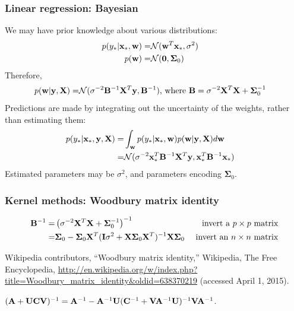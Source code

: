 \begin{frame}
\frametitle{Linear regression: Bayesian}
We may have prior knowledge about various distributions:
\begin{align*}
p(y_* | {\bf x}_*, {\bf w}) = & \mathcal{N}({\bf w}^T{\bf x}_*, \sigma^2)\cr
p({\bf w}) = & \mathcal{N}({\bf 0},\boldsymbol\Sigma_0)\cr
\end{align*}
Therefore,
\begin{align*}
p({\bf w}|{\bf y},{\bf X})  = & \mathcal{N}(\sigma^{-2}{\bf B}^{-1}{\bf X}^T{\bf y},{\bf B}^{-1}) \text{, where } {\bf B} = \sigma^{-2}{\bf X}^T{\bf X} + \boldsymbol\Sigma_0^{-1}
\end{align*}
Predictions are made by integrating out the uncertainty of the weights, rather than estimating them:
\begin{align*}
p(y_* | {\bf x}_*, {\bf y}, {\bf X}) = & \int_{\bf w} p(y_* | {\bf x}_*, {\bf w}) p({\bf w}|{\bf y},{\bf X}) d{\bf w}\cr
                                     = & \mathcal{N}(\sigma^{-2} {\bf x}_*^T {\bf B}^{-1} {\bf X}^T {\bf y}, {\bf x}_*^T{\bf B}^{-1}{\bf x}_*)
\end{align*}
Estimated parameters may be $\sigma^2$, and parameters encoding $\boldsymbol\Sigma_0$.
\end{frame}

\begin{frame}
\frametitle{Kernel methods: Woodbury matrix identity}
\begin{align*}
{\bf B}^{-1} = & \left(\sigma^{-2}{\bf X}^T{\bf X} + \boldsymbol\Sigma_0^{-1}\right)^{-1} & \text{ invert a } p \times p \text{ matrix}\\
             = & \boldsymbol\Sigma_0 - \boldsymbol\Sigma_0 {\bf X}^T({\bf I}\sigma^2 + {\bf X} \boldsymbol\Sigma_0 {\bf X}^T)^{-1} {\bf X} \boldsymbol\Sigma_0 & \text{ invert an } n \times n \text{ matrix}
\end{align*}

\vspace{0.25cm}
\begin{tiny}
Wikipedia contributors, ``Woodbury matrix identity,'' Wikipedia, The Free Encyclopedia, \url{http://en.wikipedia.org/w/index.php?title=Woodbury\_matrix\_identity\&oldid=638370219} (accessed April 1, 2015).\par
$({\bf A}+{\bf U}{\bf C}{\bf V})^{-1} = {\bf A}^{-1} - {\bf A}^{-1} {\bf U}({\bf C}^{-1} + {\bf V}{\bf A}^{-1}{\bf U})^{-1}{\bf V}{\bf A}^{-1}$.\par
\end{tiny}
\end{frame}

